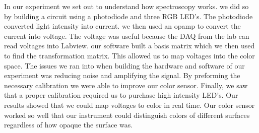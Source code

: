 \documentclass[paper=letter, fontsize=12pt]{article}
\begin{document}
In our experiment we set out to understand how spectroscopy works. we did so by building a circuit using a photodiode and three RGB LED's. The photodiode converted light intensity into current. we then used an opamp to convert the current into voltage. The voltage was useful because the DAQ from the lab can read voltages into Labview. our software built a basis matrix which we then used to find the transformation matrix. This allowed us to map voltages into the color space. The issues we ran into when building the hardware and software of our experiment was reducing noise and amplifying the signal. By preforming the necessary calibration we were able to improve our color sensor. Finally, we saw that a proper calibration required us to purchase high intensity LED's. Our results showed that we could map voltages to color in real time. Our color sensor worked so well that our instrument could distinguish colors of different surfaces regardless of how opaque the surface was.
\end{document}
